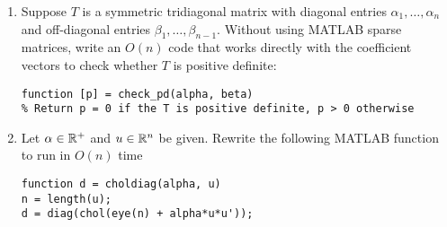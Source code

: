 \documentclass[12pt, leqno]{article}
\begin{document}
\begin{enumerate}
\item
  Suppose $T$ is a symmetric tridiagonal matrix with diagonal entries
  $\alpha_1, \ldots, \alpha_n$ and off-diagonal entries $\beta_1,
  \ldots, \beta_{n-1}$.  Without using MATLAB sparse matrices, write an
  $O(n)$ code that works directly with the coefficient vectors to
  check whether $T$ is positive definite:
\begin{verbatim}
function [p] = check_pd(alpha, beta)
% Return p = 0 if the T is positive definite, p > 0 otherwise
\end{verbatim}
  
\item
  Let $\alpha \in \mathbb{R}^+$ and $u \in \mathbb{R}^n$ be given.
  Rewrite the following MATLAB function to run in $O(n)$ time
\begin{verbatim}
function d = choldiag(alpha, u)
n = length(u);
d = diag(chol(eye(n) + alpha*u*u'));
\end{verbatim}

\end{enumerate}
\end{document}
